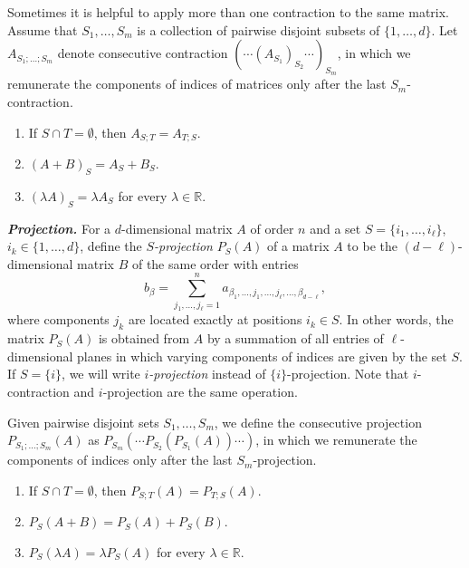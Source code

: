 \documentclass[a4paper]{article}
\begin{document}
Sometimes it is helpful to apply more than one contraction to  the same matrix. Assume that $S_1, \ldots, S_m$ is a collection of pairwise disjoint subsets of $\{ 1, \ldots, d\}$. Let  $A_{S_1; \ldots ; S_m}$ denote  consecutive contraction $(\cdots (A_{S_1})_{S_2} \cdots)_{S_m}$, in which we remunerate the components of indices of matrices only after the last $S_m$-contraction.


\begin{utv} \label{contractprop}
\item 
\begin{enumerate}
\item If $S \cap T = \emptyset$, then $A_{S ; T} = A_{T; S}$.
\item $(A + B)_S = A_S+ B_S$.
\item $(\lambda A)_S = \lambda A_S $ for every $\lambda \in \mathbb{R}$.
\end{enumerate}
\end{utv}


\textbf{\textit{Projection.}}  For a $d$-dimensional matrix $A$ of order $n$ and a set $S = \{ i_1, \ldots, i_\ell \}$, $i_k \in \{ 1, \ldots, d\}$,  define the \textit{$S$-projection}  $P_S(A)$ of a matrix $A$ to be the $(d-\ell)$-dimensional matrix $B$ of the same order with entries 
$$b_\beta = \sum\limits_{j_1, \ldots, j_\ell=1}^n  a_{\beta_1, \ldots,  j_1, \ldots, j_\ell, \ldots, \beta_{d-\ell} },$$
where components $j_k$ are located exactly at positions $i_k \in S$.
In other words, the matrix $P_S(A)$ is obtained from $A$ by a summation of all entries of $\ell$-dimensional planes in which varying components of indices are given by the set $S$. If $S = \{ i\}$, we will write \textit{$i$-projection} instead of $\{ i\}$-projection. Note that  $i$-contraction and  $i$-projection are the same operation. 

Given  pairwise disjoint sets $S_1, \ldots, S_m$, we define the consecutive projection $P_{S_1; \ldots; S_m}(A)$  as $P_{S_m}(\cdots P_{S_2}(P_{S_1}(A)) \cdots)$, in which we remunerate the components of indices only after the last $S_m$-projection.


\begin{utv} \label{projectprop}
\item 
\begin{enumerate}
\item If $S \cap T = \emptyset$, then $P_{S;T}(A) = P_{T;S}(A)$.
\item $P_S(A + B) = P_S(A)+ P_S(B)$.
\item $P_S(\lambda A) = \lambda P_S(A) $ for every $\lambda \in \mathbb{R}$.
\end{enumerate}
\end{utv}
\end{document}
